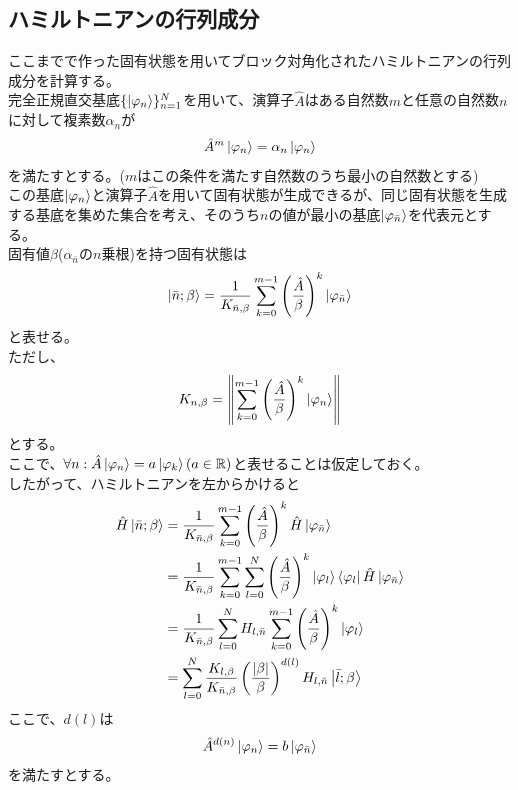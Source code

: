 \documentclass{ltjsarticle}
\begin{document}
\subsection{ハミルトニアンの行列成分}
ここまでで作った固有状態を用いてブロック対角化されたハミルトニアンの行列成分を計算する。\\
完全正規直交基底$\lbrace\ket{\varphi_n}\rbrace_{n=1}^N$を用いて、演算子$\hat{A}$はある自然数$m$と任意の自然数$n$に対して複素数$\alpha_n$が
\begin{align}
  \hat{A}^{m}\ket{\varphi_n} = \alpha_n\ket{\varphi_n}
\end{align}
を満たすとする。($m$はこの条件を満たす自然数のうち最小の自然数とする)\\
この基底$\ket{\varphi_n}$と演算子$\hat{A}$を用いて固有状態が生成できるが、同じ固有状態を生成する基底を集めた集合を考え、そのうち$n$の値が最小の基底$\ket{\varphi_{\bar{n}}}$を代表元とする。\\
固有値$\beta$($\alpha_{\bar{n}}$の$n$乗根)を持つ固有状態は
\begin{align}
  \ket{\bar{n};\beta}= \frac{1}{K_{\bar{n},\beta}}\sum_{k=0}^{m-1} \left(\frac{\hat{A}}{\beta} \right)^k \ket{\varphi_{\bar{n}}}
\end{align}
と表せる。\\
ただし、
\begin{align}
  K_{n,\beta}=\norm{\sum_{k=0}^{m-1} \left(\frac{\hat{A}}{\beta} \right)^k \ket{\varphi_{n}}}
\end{align}
とする。\\
ここで、$\forall n:\hat{A}\ket{\varphi_n}=a\ket{\varphi_k}(a\in\mathbb{R})$と表せることは仮定しておく。\\
したがって、ハミルトニアンを左からかけると
\begin{align}
  \hat{H}\ket{\bar{n};\beta} &= \frac{1}{K_{\bar{n},\beta}}\sum_{k=0}^{m-1} \left(\frac{\hat{A}}{\beta} \right)^k \hat{H}\ket{\varphi_{\bar{n}}}\\
  &= \frac{1}{K_{\bar{n},\beta}}\sum_{k=0}^{m-1}\sum_{l=0}^{N} \left(\frac{\hat{A}}{\beta} \right)^k \ket{\varphi_{l}}\bra{\varphi_{l}}\hat{H}\ket{\varphi_{\bar{n}}}\\
  &= \frac{1}{K_{\bar{n},\beta}}\sum_{l=0}^{N}H_{l,\bar{n}}\sum_{k=0}^{m-1} \left(\frac{\hat{A}}{\beta} \right)^k \ket{\varphi_{l}}\\
  &=\sum_{l=0}^{N}\frac{K_{l,\beta}}{K_{\bar{n},\beta}}\left(\frac{\abs{\beta}}{\beta}\right)^{d(l)} H_{l,\bar{n}}\ket{\bar{l};\beta}\\
\end{align}
ここで、$d(l)$は
\begin{align}
  \hat{A}^{d(n)}\ket{\varphi_n}=b\ket{\varphi_{\bar{n}}}
\end{align}
を満たすとする。
\end{document}
